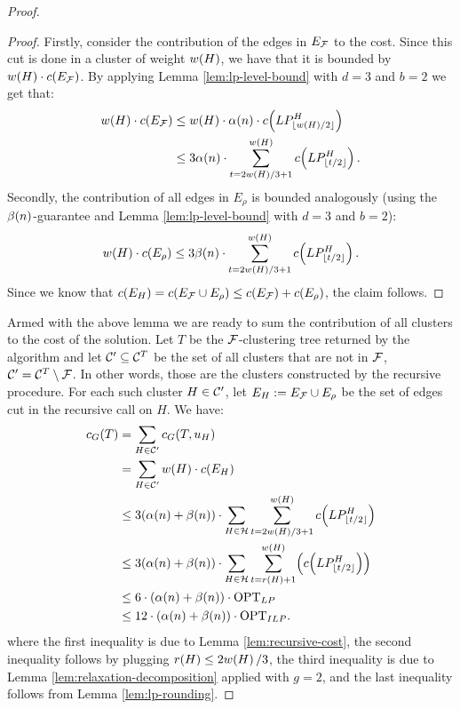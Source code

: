 \begin{proof}
\begin{proof}
        Firstly, consider the contribution of the edges in $E_{\cF}$ to the cost. Since this cut is done in a cluster of weight $w\br{H}$, we have that it is bounded by $w\br{H}\cdot c\br{E_{\cF}}$. By applying Lemma \ref{lem:lp-level-bound} with $d=3$ and $b=2$ we get that:
        \begin{align*}
              w\br{H}\cdot c\br{E_{\cF}}
              &\leq w\br{H}\cdot \alpha\br{n}\cdot c\br{LP_{\fl{w\br{H}/2}}^H}\\
              &\leq 3\alpha\br{n}\cdot
              \sum_{t=2w\br{H}/3+1}^{w\br{H}} c\br{LP_{\fl{t/2}}^H}.
        \end{align*}
        Secondly, the contribution of all edges in $E_{\rho}$ is bounded analogously (using the $\beta\br{n}$-guarantee and Lemma \ref{lem:lp-level-bound} with $d=3$ and $b=2$):
        \[
               w\br{H}\cdot c\br{E_{\rho}}
               \leq 3\beta\br{n}\cdot
               \sum_{t=2w\br{H}/3+1}^{w\br{H}} c\br{LP_{\fl{t/2}}^H}.
        \]
    Since we know that $c\br{E_H}= c\br{E_{\cF}\cup E_{\rho}}\leq c\br{E_{\cF}}+c\br{E_{\rho}}$, the claim follows.
    \end{proof}
    Armed with the above lemma we are ready to sum the contribution of all clusters to the cost of the solution. Let $T$ be the $\cF$-clustering tree returned by the algorithm and let $\cC'\subseteq\cC^{T}$ be the set of all clusters that are not in $\cF$, $\cC'=\cC^{T}\setminus\cF$.
    In other words, those are the clusters constructed by the recursive procedure.
    For each such cluster $H\in\cC'$, let $E_H:=E_{\cF}\cup E_{\rho}$ be the set of edges cut in the recursive call on $H$. We have:
    \begin{align*}
        \COST_G\br{T} &= \sum_{H \in \cC'}\COST_G\br{T, u_H}
        \\&= \sum_{H \in \cC'} w\br{H}\cdot c\br{E_H}\\
        &\leq 3\br{\alpha\br{n}+\beta\br{n}}\cdot\sum_{H \in \cH} \sum_{t=2w\br{H}/3+1}^{w\br{H}}  c\br{LP_{\fl{t/2}}^H}\\
        &\leq 3\br{\alpha\br{n}+\beta\br{n}}\cdot\sum_{H \in \cH} \sum_{t=r\br{H}+1}^{w\br{H}} \br{c\br{LP_{\fl{t/2}}^H}}\\
        &\leq 6\cdot\br{\alpha\br{n}+ \beta\br{n}}\cdot \OPT_{LP}\\
        &\leq 12\cdot\br{\alpha\br{n}+\beta\br{n}}\cdot \OPT_{ILP}.
    \end{align*}
    where the first inequality is due to Lemma \ref{lem:recursive-cost}, the second inequality follows by plugging $r\br{H}\leq 2w\br{H}/3$, the third inequality is due to Lemma \ref{lem:relaxation-decomposition} applied with $g=2$, and the last inequality follows from Lemma \ref{lem:lp-rounding}.
    \end{proof}

